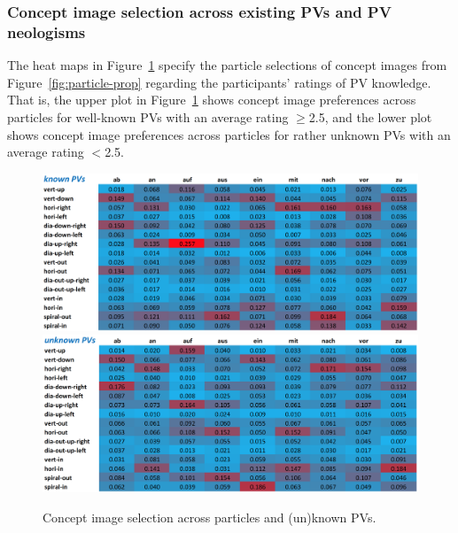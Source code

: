 \documentclass[output=paper]{langsci/langscibook}
\begin{document}
\subsubsection{Concept image selection across existing PVs and PV neologisms}

The heat maps in Figure~\ref{fig:particle-prop-neo} specify the
particle selections of concept images from Figure~\ref{fig:particle-prop}
regarding the participants' ratings of PV knowledge. That is, the
upper plot in Figure~\ref{fig:particle-prop-neo} shows concept image preferences
across particles for well-known PVs with an average rating $\ge$2.5,
and the lower plot shows concept image preferences across particles for rather
unknown PVs with an average rating $<$2.5.

\begin{figure}[htbp]
  \caption{Concept image selection across particles and (un)known PVs.}
  \label{fig:particle-prop-neo}
  \includegraphics[width=\linewidth]{figures/dataset_particles_known}
  \vspace{+4mm}\\
  \includegraphics[width=\linewidth]{figures/dataset_particles_unknown}
\end{figure}
\end{document}
